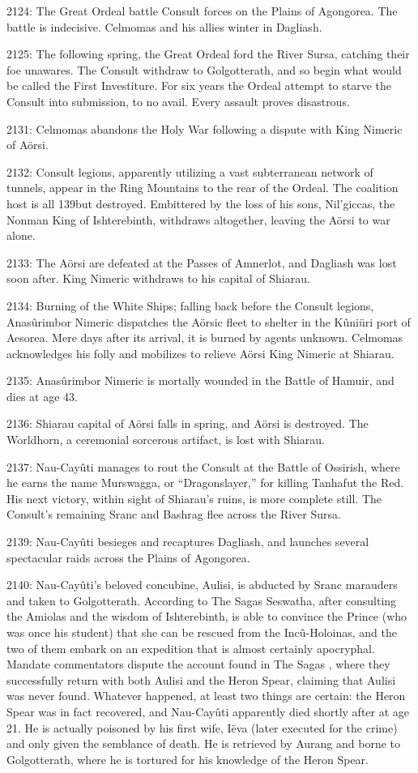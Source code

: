 \documentclass[]{book}
\begin{document}
2124: The Great Ordeal battle Consult forces on the Plains of Agongorea. The battle
is indecisive. Celmomas and his allies winter in Dagliash.

2125: The following spring, the Great Ordeal ford the River Sursa, catching their foe
unawares. The Consult withdraw to Golgotterath, and so begin what would be
called the First Investiture. For six years the Ordeal attempt to starve the
Consult into submission, to no avail. Every assault proves disastrous.

2131: Celmomas abandons the Holy War following a dispute with King Nimeric of
Aörsi.

2132: Consult legions, apparently utilizing a vast subterranean network of tunnels,
appear in the Ring Mountains to the rear of the Ordeal. The coalition host is all
139but destroyed. Embittered by the loss of his sons, Nil'giccas, the Nonman King
of Ishterebinth, withdraws altogether, leaving the Aörsi to war alone.

2133: The Aörsi are defeated at the Passes of Amnerlot, and Dagliash was lost soon
after. King Nimeric withdraws to his capital of Shiarau.

2134: Burning of the White Ships; falling back before the Consult legions,
Anasûrimbor Nimeric dispatches the Aörsic fleet to shelter in the Kûniüri port
of Aesorea. Mere days after its arrival, it is burned by agents unknown.
Celmomas acknowledges his folly and mobilizes to relieve Aörsi King Nimeric
at Shiarau.

2135: Anasûrimbor Nimeric is mortally wounded in the Battle of Hamuir, and dies at
age 43.

2136: Shiarau capital of Aörsi falls in spring, and Aörsi is destroyed. The Worldhorn,
a ceremonial sorcerous artifact, is lost with Shiarau.

2137: Nau-Cayûti manages to rout the Consult at the Battle of Ossirish, where he
earns the name Murswagga, or ``Dragonslayer,'' for killing Tanhafut the Red.
His next victory, within sight of Shiarau's ruins, is more complete still. The
Consult's remaining Sranc and Bashrag flee across the River Sursa.

2139: Nau-Cayûti besieges and recaptures Dagliash, and launches several spectacular
raids across the Plains of Agongorea.

2140: Nau-Cayûti's beloved concubine, Aulisi, is abducted by Sranc marauders and
taken to Golgotterath. According to The Sagas Seswatha, after consulting the
Amiolas and the wisdom of Ishterebinth, is able to convince the Prince (who
was once his student) that she can be rescued from the Incû-Holoinas, and the
two of them embark on an expedition that is almost certainly apocryphal.
Mandate commentators dispute the account found in The Sagas , where they
successfully return with both Aulisi and the Heron Spear, claiming that Aulisi
was never found. Whatever happened, at least two things are certain: the Heron
Spear was in fact recovered, and Nau-Cayûti apparently died shortly after at age
21. He is actually poisoned by his first wife, Iëva (later executed for the crime)
and only given the semblance of death. He is retrieved by Aurang and borne to
Golgotterath, where he is tortured for his knowledge of the Heron Spear.
\end{document}
